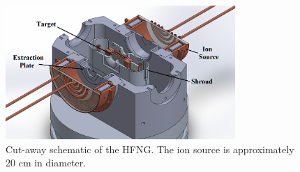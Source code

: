 


\begin{figure}
    \centering
        \centering
        \includegraphics[height=2in]{./figures/cutaway.png}
        \caption{Cut-away schematic of the HFNG. The ion source is approximately 20 cm in diameter.}
                \label{fig:hfng_b}
\end{figure}


